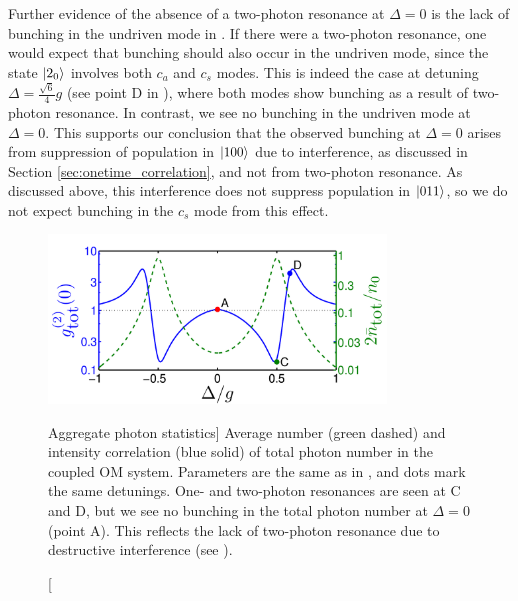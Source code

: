 Further evidence of the absence of a
two-photon resonance at $\Delta=0$ is
the lack of bunching in the undriven mode in  
.
If there were a two-photon resonance,
one would expect that bunching
should also occur in the undriven mode,
since the state $| 2_0 \rangle$ involves both $c_a$
and $c_s$ modes. 
This is indeed the case
at detuning $\Delta = \frac{\sqrt{6}}{4} g$
(see point D in ),
where
both modes show bunching as a result of
two-photon resonance.
In contrast, we see  no bunching in
the undriven mode at $\Delta = 0$. 
This supports our conclusion that the observed
bunching at $\Delta=0$ arises 
from suppression of 
population in $| 100 \rangle$ due to interference,
as discussed in Section \ref{sec:onetime_correlation},
and not from two-photon resonance.
As discussed above, this interference
does not suppress population in 
$| 011 \rangle$,
so we do not expect
bunching in the $c_s$ mode from this effect.
\begin{figure} 
\centering
  \includegraphics[width=0.8\textwidth]{./figs_Komar2013/fig3.pdf}
  \caption
  [Aggregate photon statistics]
  {
  \label{fig:populations}
  Average number (green dashed) and intensity correlation
  (blue solid)
  of total photon number in the coupled OM system.
  Parameters are the same as in ,
  and dots mark the same detunings.
  One- and two-photon resonances are
  seen at C and D,
  but we see no bunching in the
  total photon number at 
  $\Delta = 0$ (point A).
  This reflects the lack
  of two-photon resonance due to 
  destructive interference (see ).  } 
\end{figure}

